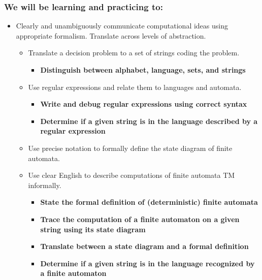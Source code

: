 \subsubsection*{We will be learning and practicing to:}
\begin{itemize}
\item Clearly and unambiguously communicate computational ideas using appropriate formalism. Translate across levels of abstraction.
\begin{itemize}
   \item Translate a decision problem to a set of strings coding the problem.
   \begin{itemize}
   \item {\bf Distinguish between alphabet, language, sets, and strings}
   \end{itemize}
   \item Use regular expressions and relate them to languages and automata.
   \begin{itemize}
      \item {\bf Write and debug regular expressions using correct syntax}
      \item {\bf Determine if a given string is in the language described by a regular expression}
   \end{itemize}
   \item Use precise notation to formally define the state diagram of finite automata.
   \item Use clear English to describe computations of finite automata TM informally.
   \begin{itemize}
      \item {\bf State the formal definition of (deterministic) finite automata}   
      \item {\bf Trace the computation of a finite automaton on a given string using its state diagram}
      \item {\bf Translate between a state diagram and a formal definition}
      \item {\bf Determine if a given string is in the language recognized by a finite automaton}
   \end{itemize}
\end{itemize}


\end{itemize}
